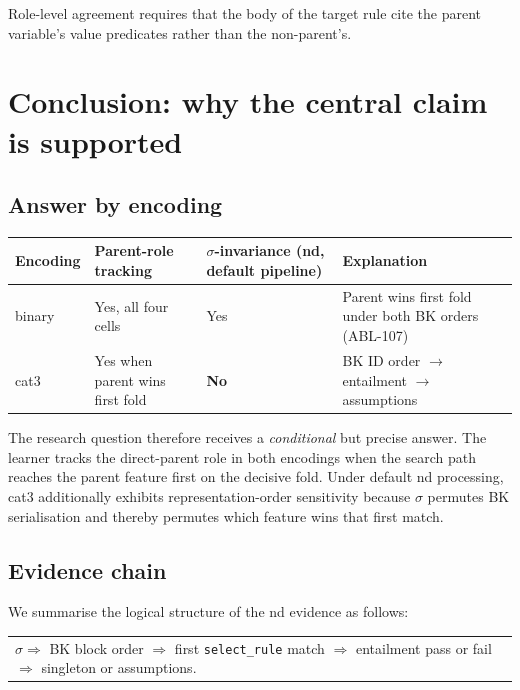 \documentclass[11pt,a4paper]{article}
\begin{document}
Role-level agreement requires that the body of the target rule cite the parent variable's value
predicates rather than the non-parent's.

\section{Conclusion: why the central claim is supported}

\subsection{Answer by encoding}

\begin{center}
\small
\setlength{\tabcolsep}{4pt}
\begin{tabularx}{\linewidth}{@{}lYYY@{}}
\toprule
Encoding & Parent-role tracking & $\sigma$-invariance (nd, default pipeline) & Explanation \\
\midrule
binary & Yes, all four cells & Yes & Parent wins first fold under both BK orders (ABL-107) \\
cat3 & Yes when parent wins first fold & \textbf{No} & BK ID order $\rightarrow$ entailment $\rightarrow$ assumptions \\
\bottomrule
\end{tabularx}
\end{center}

The research question therefore receives a \emph{conditional} but precise answer. The learner
tracks the direct-parent role in both encodings when the search path reaches the parent feature
first on the decisive fold. Under default nd processing, cat3 additionally exhibits
representation-order sensitivity because $\sigma$ permutes BK serialisation and thereby permutes
which feature wins that first match.

\subsection{Evidence chain}

We summarise the logical structure of the nd evidence as follows:

\begin{center}
\small
\begin{tabularx}{\linewidth}{@{}Y@{}}
$\sigma \Rightarrow$ BK block order $\Rightarrow$ first \texttt{select\_rule} match
$\Rightarrow$ entailment pass or fail $\Rightarrow$ singleton or assumptions.
\end{tabularx}
\end{center}
\end{document}
